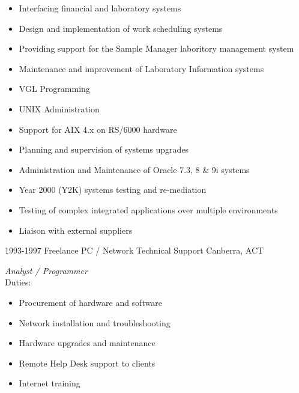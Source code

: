\documentclass[]{friggeri-cv} %
\begin{document}
\begin{entrylist}
{\begin{itemize}
\item Interfacing financial and laboratory systems
\item Design and implementation of work scheduling systems
\item Providing support for the Sample Manager laboritory management system
\item Maintenance and improvement of Laboratory Information systems
\item VGL Programming
\item UNIX Administration
\item Support for AIX 4.x on RS/6000 hardware
\item Planning and supervision of systems upgrades
\item Administration and Maintenance of Oracle 7.3, 8 \& 9i systems
\item Year 2000 (Y2K) systems testing and re-mediation
\item Testing of complex integrated applications over multiple environments
\item Liaison with external suppliers
\end{itemize}}
\entry
{1993-1997}
{Freelance PC / Network Technical Support}
{Canberra, ACT}
{\emph{Analyst / Programmer} \\
Duties:
\begin{itemize}
\item Procurement of hardware and software
\item Network installation and troubleshooting
\item Hardware upgrades and maintenance
\item Remote Help Desk support to clients
\item Internet training
\end{itemize}}
\end{entrylist}
\end{document}
